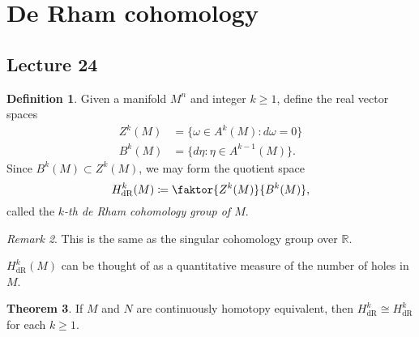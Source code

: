 \documentclass[10pt,letterpaper,cm]{nupset}
\theoremstyle{definition}
\newtheorem{definition}{Definition}[subsection]
\theoremstyle{theorem}
\newtheorem{theorem}[definition]{Theorem}
\theoremstyle{remark}
\newtheorem{remark}[definition]{Remark}
\newcommand{\R}{\mathbb R}
\newcommand{\1}{\mathbf{1}}
\newcommand{\0}{\vec 0}
\DeclareMathOperator{\dr}{dR}
\begin{document}
\section{De Rham cohomology}

\subsection{Lecture 24}

\begin{definition}
Given a manifold $M^n$ and integer $k\geq 1$, define the real vector spaces
\begin{align*}
  Z^k(M) &  = \{\omega \in A^k(M) : d\omega =0\}
 \\  B^k(M) & = \{ d\eta : \eta \in A^{k-1}(M)\}.
 \end{align*}
 Since $B^k(M) \subset Z^k(M)$, we may form the quotient space $$ H_{\dr}^k(M) \coloneqq  \faktor{Z^k(M)}{B^k(M)},$$ called the \textit{$k$-th de Rham cohomology group of $M$}.
\end{definition}

\begin{remark}
This is the same as the singular cohomology group over $\R$.
\end{remark}

$H_{\dr}^k(M)$ can be thought of as a quantitative measure of the number of holes in $M$.

\begin{theorem}
If $M$ and $N$ are continuously homotopy equivalent, then $H_{\dr}^k \cong H_{\dr}^k$ for each $k\geq 1$.
\end{theorem}
\end{document}
